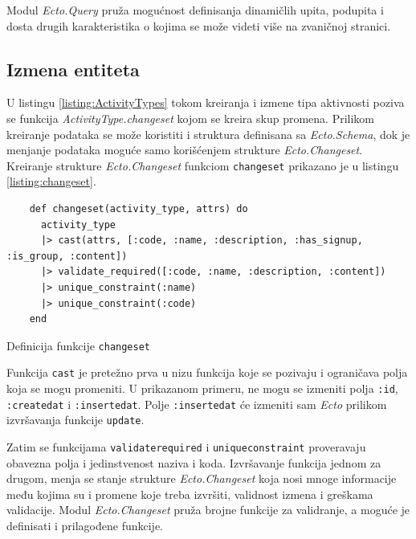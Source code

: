 \documentclass[12pt,oneside]{memoir}
\begin{document}
Modul \emph{Ecto.Query} pruža mogućnost definisanja dinamičlih upita, podupita i dosta drugih karakteristika o kojima se može videti više na zvaničnoj stranici.

\subsection{Izmena entiteta}
U listingu \ref{listing:ActivityTypes} tokom kreiranja i izmene tipa aktivnosti poziva se
funkcija \emph{ActivityType.changeset} kojom se kreira skup promena. Prilikom kreiranje
podataka se može koristiti i struktura definisana sa \emph{Ecto.Schema}, dok je 
menjanje podataka moguće samo korišćenjem strukture \emph{Ecto.Changeset}.
Kreiranje strukture  \emph{Ecto.Changeset} funkciom \texttt{changeset} 
prikazano je u listingu \ref{listing:changeset}. 
\begin{listing}[!h]
\begin{verbatim}
    def changeset(activity_type, attrs) do
      activity_type
      |> cast(attrs, [:code, :name, :description, :has_signup, :is_group, :content])
      |> validate_required([:code, :name, :description, :content])
      |> unique_constraint(:name)
      |> unique_constraint(:code)
    end
\end{verbatim}
\caption{Definicija funkcije \texttt{changeset}}
\label{listing:changeset}
\end{listing}

Funkcija \texttt{cast} je pretežno prva u nizu funkcija koje se pozivaju i ograničava polja koja se mogu promeniti.
U prikazanom primeru, ne mogu se izmeniti polja \texttt{:id}, \texttt{:created{\textunderscore}at} i
\texttt{:inserted{\textunderscore}at}. Polje \texttt{:inserted{\textunderscore}at} će izmeniti sam \emph{Ecto}
prilikom izvršavanja funkcije \texttt{update}.

Zatim se funkcijama \texttt{validate{\textunderscore}required} i \texttt{unique{\textunderscore}constraint} 
proveravaju obavezna polja i jedinstvenost naziva i koda. Izvršavanje funkcija jednom za drugom, menja se stanje
strukture \emph{Ecto.Changeset} koja nosi mnoge informacije među kojima su i promene koje treba izvršiti, validnost izmena
i greškama validacije. Modul \emph{Ecto.Changeset} pruža brojne funkcije za validranje, a moguće je definisati i prilagođene funkcije.
\end{document}
